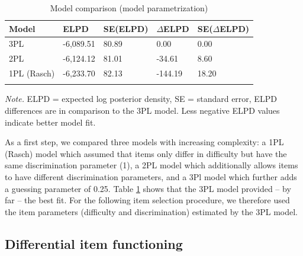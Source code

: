 \documentclass[
  man,floatsintext]{apa6}
\begin{document}
\begin{table}[tbp]

\begin{center}
\begin{threeparttable}

\caption{\label{tab:tab1}Model comparison (model parametrization)}

\begin{tabular}{lllll}
\toprule
Model & ELPD & SE(ELPD) & $\Delta$ELPD & SE($\Delta$ELPD)\\
\midrule
3PL & -6,089.51 & 80.89 & 0.00 & 0.00\\
2PL & -6,124.12 & 81.01 & -34.61 & 8.60\\
1PL (Rasch) & -6,233.70 & 82.13 & -144.19 & 18.20\\
\bottomrule
\addlinespace
\end{tabular}

\begin{tablenotes}[para]
\normalsize{\textit{Note.} ELPD = expected log posterior density, SE = standard error, ELPD differences are in comparison to the 3PL model. Less negative ELPD values indicate better model fit.}
\end{tablenotes}

\end{threeparttable}
\end{center}

\end{table}

As a first step, we compared three models with increasing complexity: a 1PL (Rasch) model which assumed that items only differ in difficulty but have the same discrimination parameter (1), a 2PL model which additionally allows items to have different discrimination parameters, and a 3Pl model which further adds a guessing parameter of 0.25. Table \ref{tab:tab1} shows that the 3PL model provided -- by far -- the best fit. For the following item selection procedure, we therefore used the item parameters (difficulty and discrimination) estimated by the 3PL model.

\hypertarget{differential-item-functioning}{%
\subsection{Differential item functioning}\label{differential-item-functioning}}
\end{document}
